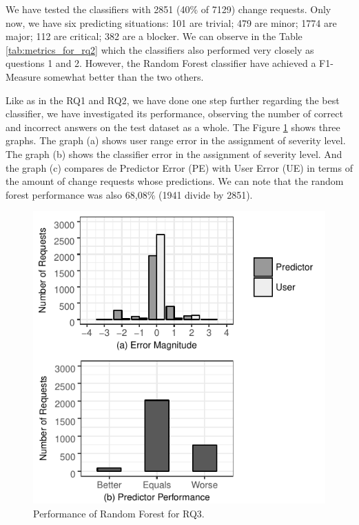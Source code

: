 \documentclass[10pt, conference]{IEEEtran}
\begin{document}
We have tested the classifiers with 2851 (40\% of 7129) change requests. Only now, we have six predicting situations: 101 are trivial; 479 are minor; 1774 are major; 112 are critical; 382 are a blocker. We can observe in the Table \ref{tab:metrics_for_rq2} which the classifiers also performed very closely as questions 1 and 2. However, the Random Forest classifier have achieved a F1-Measure somewhat better than the two others.


Like as in the RQ1 and RQ2, we have done one step further regarding the best classifier, we have investigated its performance, observing the number of correct and incorrect answers on the test dataset as a whole. The Figure \ref{fig:rf_performance_for_q3} shows three graphs. The graph (a) shows user range error in the assignment of severity level. The graph (b) shows the classifier error in the assignment of severity level. And the graph (c) compares de Predictor Error (PE) with User Error (UE) in terms of the amount of change requests whose predictions. We can note that the random forest performance was also 68,08\% (1941 divide by 2851). 


\begin{figure}[ht]
  \label{fig:rf_performance_for_q3}
  \includegraphics{figures/rf_performance_for_q3.pdf}
  \caption{Performance of Random Forest for RQ3.}
\end{figure}
\end{document}
